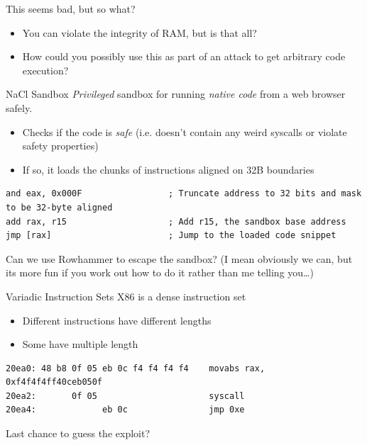 \documentclass[9pt,aspectratio=169]{beamer}
\begin{document}
\begin{frame}[label={sec:orgf8a5c84}]{This seems bad, but so what?}
\begin{itemize}
\item You can violate the integrity of RAM, but is that all?
\item How could you possibly use this as part of an attack to get arbitrary code execution?
\end{itemize}
\end{frame}

\begin{frame}[label={sec:org3793dd2},fragile]{NaCl Sandbox}
 \emph{Privileged} sandbox for running \emph{native code} from a web browser safely.
\begin{itemize}
\item Checks if the code is \emph{safe} (i.e. doesn't contain any weird syscalls or violate safety properties)
\item If so, it loads the chunks of instructions aligned on 32B boundaries
\end{itemize}

\begin{verbatim}
and eax, 0x000F                 ; Truncate address to 32 bits and mask to be 32-byte aligned
add rax, r15                    ; Add r15, the sandbox base address
jmp [rax]                       ; Jump to the loaded code snippet
\end{verbatim}

\vfill
\begin{block}{Can we use Rowhammer to escape the sandbox?}
\footnotesize
(I mean obviously we can, but its more fun if you work out how to do
it rather than me telling you\ldots{})
\end{block}
\end{frame}

\begin{frame}[label={sec:org5af369d},fragile]{Variadic Instruction Sets}
 X86 is a dense instruction set
\begin{itemize}
\item Different instructions have different lengths
\item Some have multiple length
\end{itemize}

\begin{verbatim}
20ea0: 48 b8 0f 05 eb 0c f4 f4 f4 f4    movabs rax, 0xf4f4f4ff40ceb050f
20ea2:       0f 05                      syscall
20ea4:             eb 0c                jmp 0xe
\end{verbatim}

\begin{block}{Last chance to guess the exploit?}
\end{block}
\end{frame}
\end{document}
